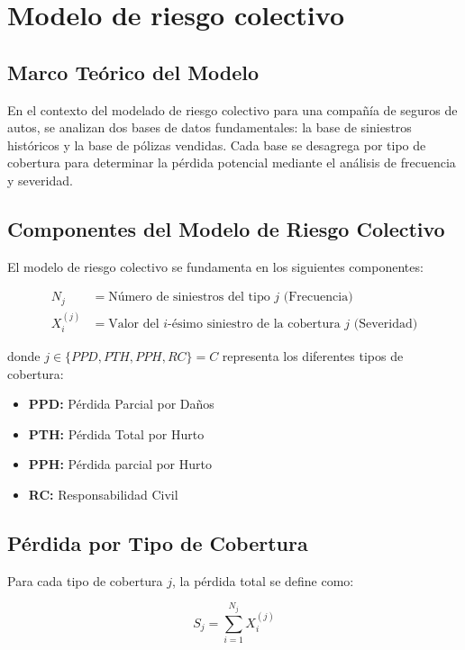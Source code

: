 \section{Modelo de riesgo colectivo}

\subsection{Marco Teórico del Modelo}

En el contexto del modelado de riesgo colectivo para una compañía de seguros de autos, se analizan dos bases de datos fundamentales: la base de siniestros históricos y la base de pólizas vendidas. Cada base se desagrega por tipo de cobertura para determinar la pérdida potencial mediante el análisis de frecuencia y severidad.

\subsection{Componentes del Modelo de Riesgo Colectivo}

El modelo de riesgo colectivo se fundamenta en los siguientes componentes:

\begin{align*}
N_j &= \text{Número de siniestros del tipo } j \text{ (Frecuencia)} \\
X_{i}^{(j)} &= \text{Valor del $i$-ésimo siniestro de la cobertura } j \text{ (Severidad)}
\end{align*}

donde $j \in \{PPD, PTH, PPH, RC\} = C$ representa los diferentes tipos de cobertura:
\begin{itemize}
    \item \textbf{PPD:} Pérdida Parcial por Daños
    \item \textbf{PTH:} Pérdida Total por Hurto
    \item \textbf{PPH:} Pérdida parcial por Hurto
    \item \textbf{RC:} Responsabilidad Civil
\end{itemize}

\subsection{Pérdida por Tipo de Cobertura}

Para cada tipo de cobertura $j$, la pérdida total se define como:

\begin{equation*}
S_j = \sum_{i=1}^{N_j} X_i^{(j)}
\end{equation*}

